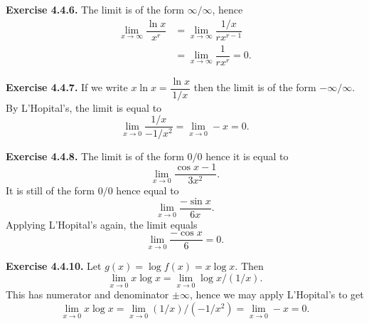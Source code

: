 \documentclass[12pt]{book}
\newenvironment{exercise}[2][Exercise]{\begin{trivlist}
\item[\hskip \labelsep {\bfseries #1}\hskip \labelsep {\bfseries #2.}]}{\end{trivlist}}
\newcommand{\prb}[1]{\textbf{Exercise #1.}}
\begin{document}
\begin{exercise}{4.4.5}
\end{exercise}



\prb{4.4.6} The limit is of the form $\infty/\infty$, hence \begin{align*}
\lim_{x \rightarrow \infty} \dfrac{\ln x}{x^r} & = \lim_{x \rightarrow \infty} \dfrac{1/x}{rx^{r-1}} \\
& = \lim_{x \rightarrow \infty} \dfrac{1}{rx^{r}} = 0. \end{align*}

\prb{4.4.7} If we write $x \ln x = \dfrac{\ln x}{1/x}$ then the limit is of the form $-\infty/\infty$. By L'Hopital's, the limit is equal to $$\lim_{x \rightarrow 0} \dfrac{1/x}{-1/x^2} = \lim_{x \rightarrow 0} -x = 0.$$

\prb{4.4.8} The limit is of the form $0/0$ hence it is equal to $$\lim_{x \rightarrow 0} \dfrac{\cos x - 1}{3x^2}.$$ It is still of the form $0/0$ hence equal to $$\lim_{x \rightarrow 0} \dfrac{-\sin x }{6x}.$$ Applying L'Hopital's again, the limit equals $$\lim_{x \rightarrow 0} \dfrac{-\cos x }{6} = 0.$$ 



\begin{exercise}{4.4.9}
\end{exercise}


\prb{4.4.10} Let $g(x) = \log f(x) = x \log x.$ Then $$\lim_{x \rightarrow 0} x \log x = \lim_{x \rightarrow 0} \log x /(1/x).$$ This has numerator and denominator $\pm \infty$, hence we may apply L'Hopital's to get $$\lim_{x \rightarrow 0} x \log x = \lim_{x \rightarrow 0} (1/x)/(-1/x^2) = \lim_{x \rightarrow 0} - x = 0.$$


\begin{exercise}{4.4.11}
\end{exercise}

\begin{exercise}{4.4.12}
\end{exercise}


\begin{exercise}{4.4.13}
\end{exercise}


\begin{exercise}{4.4.14}
\end{exercise}

\begin{exercise}{4.4.15}
\end{exercise}
\end{document}
